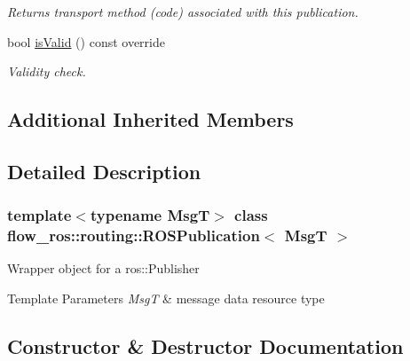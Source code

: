 \begin{DoxyCompactItemize}
\begin{DoxyCompactList}\small\item\em Returns transport method (code) associated with this publication. \end{DoxyCompactList}\item 
bool \hyperlink{classflow__ros_1_1routing_1_1_r_o_s_publication_aa7a132708199fe33bbb1420211aa7f78}{is\+Valid} () const override
\begin{DoxyCompactList}\small\item\em Validity check. \end{DoxyCompactList}\end{DoxyCompactItemize}
\subsection*{Additional Inherited Members}


\subsection{Detailed Description}
\subsubsection*{template$<$typename MsgT$>$\newline
class flow\+\_\+ros\+::routing\+::\+R\+O\+S\+Publication$<$ Msg\+T $>$}

Wrapper object for a {\ttfamily ros\+::\+Publisher} 


\begin{DoxyTemplParams}{Template Parameters}
{\em MsgT} & message data resource type \\
\hline
\end{DoxyTemplParams}


\subsection{Constructor \& Destructor Documentation}
\mbox{\label{classflow__ros_1_1routing_1_1_r_o_s_publication_a78988f8588dc65e7e6b97dcb89b3f32a}} 
